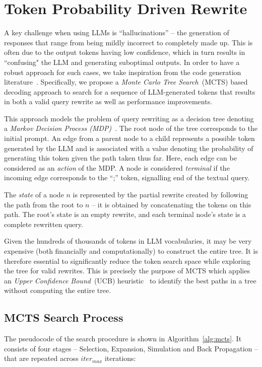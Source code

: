 \section{Token Probability Driven Rewrite}
\label{sec:mtcs-rewrite}

A key challenge when using LLMs is ``hallucinations'' -- the generation of responses that range from being mildly incorrect to completely made up. This is often due to the output tokens having low confidence, which in turn results in ``confusing" the LLM and generating suboptimal outputs.
%
In order to have a robust approach for such cases, 
%
we take inspiration from the code generation literature~\cite{CodeGen}.
Specifically, we propose a 
\textit{Monte Carlo Tree Search}~(MCTS) based decoding approach to search for a sequence of LLM-generated tokens that results in both a valid query rewrite as well as performance improvements.

This approach models the problem of query rewriting as a decision tree denoting a \textit{Markov Decision Process (MDP)}~\cite{mdp}. The root node of the tree corresponds to the initial prompt. 
An edge from a parent node to a child represents a possible token generated by the LLM and is associated with a value denoting the probability of generating this token given the path taken thus far.
Here, each edge can be considered as an \textit{action} of the MDP. A node is considered \textit{terminal} if the incoming edge corresponds to the “;” token, signalling end of the textual query.

The \textit{state} of a node $n$ 
is represented by the partial rewrite created by following the path from the root to $n$ -- it is obtained by concatenating the tokens on this path. The root's state is an empty rewrite, and each terminal node's state is a complete rewritten query. 
%

Given the hundreds of thousands of tokens in LLM vocabularies, it may be very expensive (both financially and computationally) to construct the entire tree. It is therefore essential to significantly reduce the token search space while exploring the tree for valid rewrites.
%
This is precisely the purpose of MCTS which applies an \textit{Upper Confidence Bound}~(UCB) heuristic~\cite{ucb} to identify the best paths in a tree without computing the entire tree.
%



\subsection{MCTS Search Process}
The pseudocode of the search procedure is shown in Algorithm~\ref{alg:mcts}. It consists of four stages -- Selection, Expansion, Simulation and Back Propagation -- that are repeated across $iter_{max}$ iterations:


